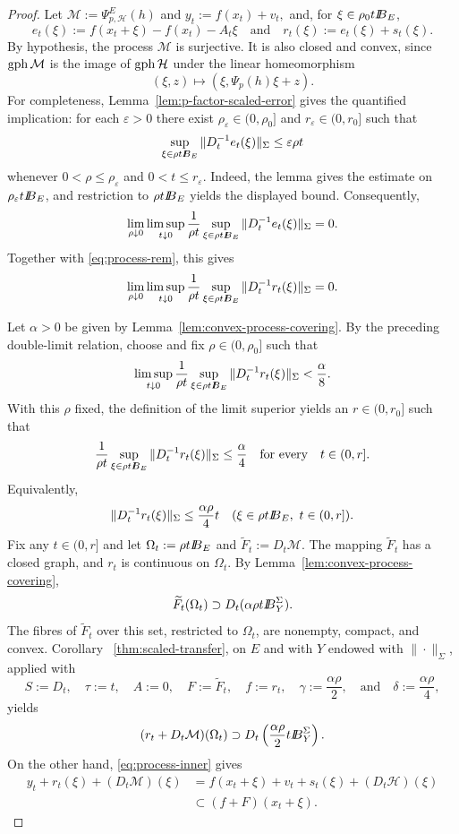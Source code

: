 \documentclass[11pt]{amsart}
\theoremstyle{definition}
\theoremstyle{remark}
\newcommand{\gph}{\mathop{\rm gph}\nolimits}
\def\ball{{I\kern -.35em B}}
\begin{document}
	\begin{proof}
		Let
		$\mathcal M:=\Psi_{p,\mathcal H}^{E}(h)$ and $y_t:=f(x_t)+v_t,$
		and, for $\xi\in\rho_0t\ball_E$,
		$$
		e_t(\xi):=f(x_t+\xi)-f(x_t)-A_t\xi
		\quad\text{and}\quad
		r_t(\xi):=e_t(\xi)+s_t(\xi).
		$$
		By hypothesis, the process $\mathcal M$ is surjective. It is also closed
		and convex, since $\gph\mathcal M$ is the image of $\gph\mathcal H$ under the linear
		homeomorphism
		$$
		(\xi,z)\longmapsto(\xi,\Psi_p(h)\xi+z).
		$$
		For completeness, Lemma~\ref{lem:p-factor-scaled-error} gives the
		quantified implication: for each $\varepsilon>0$ there exist
		$\rho_\varepsilon\in (0,\rho_0]$ and $r_\varepsilon\in (0,r_0]$ such that
		$$
		\sup_{\xi\in\rho t\ball_E}
		\|D_t^{-1}e_t(\xi)\|_\Sigma
		\le\varepsilon\rho t
		$$
		whenever $0<\rho\le\rho_\varepsilon$ and
		$0<t\le r_\varepsilon$.  Indeed, the lemma gives the estimate on
		$\rho_\varepsilon t\ball_E$, and restriction to
		$\rho t\ball_E$ yields the displayed bound.  Consequently,
		$$
		\lim_{\rho\downarrow0}\limsup_{t\downarrow0}
		\frac{1}{\rho t}
		\sup_{\xi\in\rho t\ball_E}
		\|D_t^{-1}e_t(\xi)\|_\Sigma=0.
		$$
		Together with \eqref{eq:process-rem}, this gives
		$$
		\lim_{\rho\downarrow0}\limsup_{t\downarrow0}
		\frac{1}{\rho t}
		\sup_{\xi\in\rho t\ball_E}
		\|D_t^{-1}r_t(\xi)\|_{\Sigma}=0.
		$$
		
		Let $\alpha>0$ be given by
		Lemma~\ref{lem:convex-process-covering}. By the preceding double-limit
		relation, choose and fix $\rho\in(0,\rho_0]$ such that
		$$
		\limsup_{t\downarrow0}
		\frac{1}{\rho t}
		\sup_{\xi\in\rho t\ball_E}
		\|D_t^{-1}r_t(\xi)\|_{\Sigma}
		<\frac{\alpha}{8}.
		$$
		With this $\rho$ fixed, the definition of the limit superior yields an
		$r\in(0,r_0]$ such that
		$$
		\frac{1}{\rho t}
		\sup_{\xi\in\rho t\ball_E}
		\|D_t^{-1}r_t(\xi)\|_{\Sigma}
		\le\frac{\alpha}{4}
		\quad\text{for every}\quad t\in(0,r].
		$$
		Equivalently,
		$$
		\|D_t^{-1}r_t(\xi)\|_{\Sigma}
		\le\frac{\alpha\rho}{4}t
		\quad
		(\xi\in\rho t\ball_E,\ t\in(0,r]).
		$$
		Fix any $t\in(0,r]$ and let
		$\Omega_t:=\rho t\ball_E$ and $\widetilde F_t:=D_t\mathcal M$.
		The mapping $\widetilde F_t$ has a closed graph, and $r_t$ is
		continuous on $\Omega_t$.
		By Lemma~\ref{lem:convex-process-covering},
		$$
		\widetilde F_t(\Omega_t)
		\supset D_t(\alpha\rho t\ball_Y^{\Sigma}).
		$$
		The fibres of $\widetilde F_t$ over this set, restricted to
		$\Omega_t$, are nonempty, compact, and convex. Corollary~%
		\ref{thm:scaled-transfer}, on $E$ and with $Y$ endowed with
		$\|\cdot\|_\Sigma$, applied with
		$$
		S:=D_t,\quad \tau:=t,\quad A:=0,\quad F:=\widetilde F_t,\quad
		f:=r_t,\quad
		\gamma:=\frac{\alpha\rho}{2},\quad\text{and}\quad
		\delta:=\frac{\alpha\rho}{4},
		$$
		yields
		$$
		(r_t+D_t\mathcal M)(\Omega_t)
		\supset
		D_t\left(\frac{\alpha\rho}{2}t\ball_Y^{\Sigma}\right).
		$$
		On the other hand, \eqref{eq:process-inner} gives
		$$
		\begin{aligned}
			y_t+r_t(\xi)+(D_t\mathcal M)(\xi)
			&=f(x_t+\xi)+v_t+s_t(\xi)+(D_t\mathcal H)(\xi)\\
			&\subset(f+F)(x_t+\xi).
		\end{aligned}
		$$
		

\end{proof}
\end{document}
